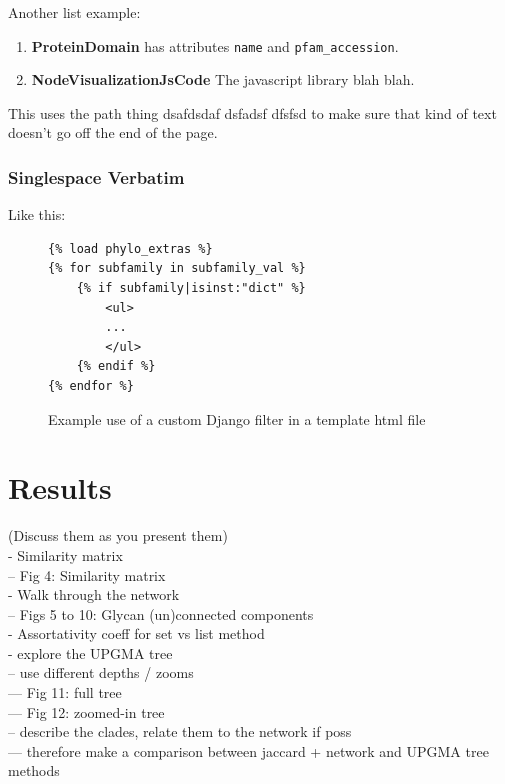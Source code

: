 \documentclass[12pt,a4paper]{article}
\begin{document}
Another list example:

\begin{enumerate}
\item {\bf ProteinDomain} has attributes \texttt{name} and \texttt{pfam\_accession}.
\item {\bf NodeVisualizationJsCode} The javascript library blah blah.
\end{enumerate}


This uses the path thing dsafdsdaf dsfadsf dfsfsd  to make sure that kind of text doesn't go off the end of the page. 

\subsubsection{Singlespace Verbatim}
\label{sec:template_tags}
Like this:
\singlespace
\begin{figure}[H]
\begin{verbatim}
{% load phylo_extras %}
{% for subfamily in subfamily_val %}
    {% if subfamily|isinst:"dict" %}
        <ul>
        ...
        </ul>
    {% endif %}
{% endfor %}
\end{verbatim}
\caption{Example use of a custom Django filter in a template html file}
\label{fig:custom_filter_code}
\end{figure}
\doublespace

\section{Results}
\label{sec:results}
(Discuss them as you present them)\\

- Similarity matrix\\
-- Fig 4: Similarity matrix\\
- Walk through the network\\
-- Figs 5 to 10: Glycan (un)connected components\\
- Assortativity coeff for set vs list method\\

- explore the UPGMA tree\\
-- use different depths / zooms\\
--- Fig 11: full tree\\
--- Fig 12: zoomed-in tree\\
-- describe the clades, relate them to the network if poss\\
--- therefore make a comparison between jaccard + network and UPGMA tree methods\\
\end{document}
